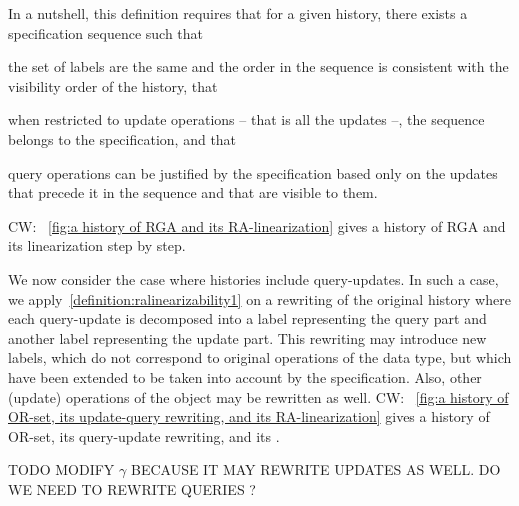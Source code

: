 In a nutshell, this definition requires that for a given
history, there exists a specification sequence such
that
\begin{inparaenum}
\item the set of labels are the same and the order in the sequence is
  consistent with the visibility order of the history, that
\item when restricted to update operations -- that is all the updates --, the sequence belongs to
  the specification, and that
\item query operations can be justified by the specification based only
  on the updates that precede it in the sequence and that are visible to them.
\end{inparaenum}

 {\color {red}CW: \figurename~\ref{fig:a history of RGA and its RA-linearization} gives a history of RGA and its linearization step by step.}

We now consider the case where histories include query-updates.
In such a case, we apply~\autoref{definition:ralinearizability1} on a
rewriting of the original history where each query-update is
decomposed into a label representing the query part and another label
representing the update part.
{This rewriting may introduce new labels, which do not correspond to
original operations of the data type, but which have been extended to
be taken into account by the specification.
Also, other (update) operations of the object may be rewritten as
well.}
 {\color {red}CW: \figurename~\ref{fig:a history of OR-set, its update-query rewriting, and its RA-linearization} gives a history of OR-set, its query-update rewriting, and its \crdtlinearization{}.}

TODO MODIFY $\gamma$ BECAUSE IT MAY REWRITE UPDATES AS WELL. DO WE NEED TO REWRITE QUERIES ?

